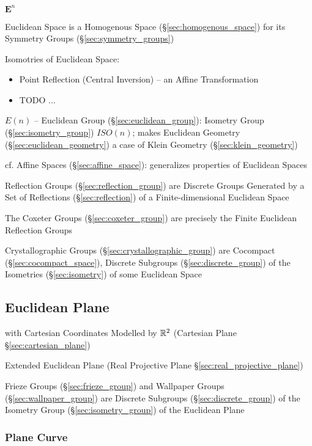 $\mathbf{E}^n$

Euclidean Space is a Homogenous Space (\S\ref{sec:homogenous_space}) for its
Symmetry Groups (\S\ref{sec:symmetry_groups})

Isomotries of Euclidean Space:
\begin{itemize}
  \item Point Reflection (Central Inversion) -- an Affine Transformation
  \item TODO
  ...
\end{itemize}

$E(n)$ -- Euclidean Group (\S\ref{sec:euclidean_group}): Isometry Group
(\S\ref{sec:isometry_group}) $ISO(n)$; makes Euclidean Geometry
(\S\ref{sec:euclidean_geometry}) a case of Klein Geometry
(\S\ref{sec:klein_geometry})

cf. Affine Spaces (\S\ref{sec:affine_space}): generalizes properties
of Euclidean Spaces

Reflection Groups (\S\ref{sec:reflection_group}) are Discrete Groups Generated
by a Set of Reflections (\S\ref{sec:reflection}) of a Finite-dimensional
Euclidean Space

The Coxeter Groups (\S\ref{sec:coxeter_group}) are precisely the Finite
Euclidean Reflection Groups

Crystallographic Groups (\S\ref{sec:crystallographic_group}) are Cocompact
(\S\ref{sec:cocompact_space}), Discrete Subgroups (\S\ref{sec:discrete_group})
of the Isometries (\S\ref{sec:isometry}) of some Euclidean Space



\subsection{Euclidean Plane}\label{sec:euclidean_plane}

with Cartesian Coordinates Modelled by $\mathbb{R}^2$ (Cartesian Plane
\S\ref{sec:cartesian_plane})

\fist Extended Euclidean Plane (Real Projective Plane
\S\ref{sec:real_projective_plane})

Frieze Groups (\S\ref{sec:frieze_group}) and Wallpaper Groups
(\S\ref{sec:wallpaper_group}) are Discrete Subgroups
(\S\ref{sec:discrete_group}) of the Isometry Group (\S\ref{sec:isometry_group})
of the Euclidean Plane



\subsubsection{Plane Curve}\label{sec:plane_curve}


